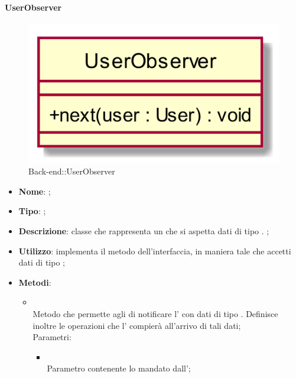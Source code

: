 \hypertarget{UserObserver_label}{\paragraph{UserObserver}}
\begin{figure}[h]
	\centering
	\includegraphics[width=\textwidth,height=\textheight,keepaspectratio]{images/ClassUserObserver.png}
	\caption{Back-end::UserObserver}
\end{figure}
\begin{itemize}
	\item \textbf{Nome}: ;
	\item \textbf{Tipo}: ;
	\item \textbf{Descrizione}: classe che rappresenta un  che si aspetta dati di tipo . ;
	\item \textbf{Utilizzo}: implementa il metodo  dell'interfaccia, in maniera tale che accetti dati di tipo ;
	\item \textbf{Metodi}:
	\begin{itemize}
		\item[]  \\
		Metodo che permette agli  di notificare l' con dati di tipo . Definisce inoltre le operazioni che l' compierà all'arrivo di tali dati;\\
		Parametri:
		\begin{itemize}
			\item {} \\
			Parametro contenente lo  mandato dall';
		\end{itemize}
	\end{itemize}
\end{itemize}

